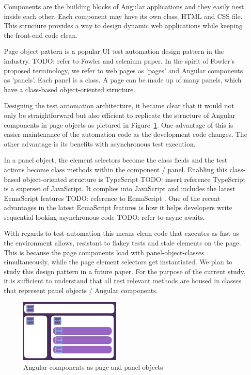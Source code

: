 \documentclass[conference]{IEEEtran}
\newcommand{\todo}[1]{}
\renewcommand{\todo}[1]{{\color{red} TODO: {#1}}}
\begin{document}
	Components are the building blocks of Angular applications and they easily nest inside each other.
	Each component may have its own class, HTML and CSS file. This structure provides a way to design dynamic web applications while keeping the front-end code clean. 

	Page object pattern is a popular UI test automation design pattern in the industry. \todo{refer to Fowler and selenium paper}.
	In the spirit of Fowler's proposed terminology, we refer to web pages as 'pages' and Angular components as 'panels'.
	Each panel is a class. A page can be made up of many panels, which have a class-based object-oriented structure.   

	Designing the test automation architecture, it became clear that it would not only be straightforward but also efficient to replicate the structure of Angular components in page objects as pictured in Figure~\ref{fig:angular}.
	One advantage of this is easier maintenance of the automation code as the development code changes.
	The other advantage is its benefits with asynchronous test execution.

	In a panel object, the element selectors become the class fields and the test actions become class methods within the component / panel.
	Enabling this class-based object-oriented structure is TypeScript \todo{insert reference}
	TypeScript is a superset of JavaScript. It complies into JavaScript and includes the latest EcmaScript features \todo{reference to EcmaScript} .
	One of the recent advantages in the latest EcmaScript features is how it helps developers write sequential looking asynchronous code \todo{refer to async awaits}.

	With regards to test automation this means clean code that executes as fast as the environment allows, resistant to flakey tests and stale elements on the page. 
	This is because the page components load with panel-object-classes simultaneously, while the page element selectors get instantiated.
	We plan to study this design pattern in a future paper. For the purpose of the current study, it is sufficient to understand that all test relevant methods are housed in classes that represent panel objects / Angular components.
	
	\begin{figure}[!h]
		\includegraphics[width=0.45\textwidth,]{angular.pdf}
	\caption{Angular components as page and panel objects}
	\label{fig:angular}
	\end{figure}
\end{document}
